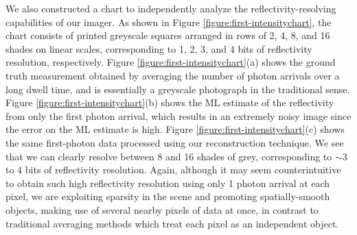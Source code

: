 We also constructed a chart to independently analyze the reflectivity-resolving capabilities of our imager. As shown in Figure \ref{figure:first-intensitychart}, the chart consists of printed greyscale squares arranged in rows of 2, 4, 8, and 16 shades on linear scales, corresponding to 1, 2, 3, and 4 bits of reflectivity resolution, respectively. Figure \ref{figure:first-intensitychart}(a) shows the ground truth measurement obtained by averaging the number of photon arrivals over a long dwell time, and is essentially a greyscale photograph in the traditional sense. Figure \ref{figure:first-intensitychart}(b) shows the ML estimate of the reflectivity from only the first photon arrival, which results in an extremely noisy image since the error on the ML estimate is high. Figure \ref{figure:first-intensitychart}(c) shows the same first-photon data processed using our reconstruction technique. We see that we can clearly resolve between 8 and 16 shades of grey, corresponding to $\sim$3 to 4 bits of reflectivity resolution. Again, although it may seem counterintuitive to obtain such high reflectivity resolution using only 1 photon arrival at each pixel, we are exploiting sparsity in the scene and promoting spatially-smooth objects, making use of several nearby pixels of data at once, in contrast to traditional averaging methods which treat each pixel as an independent object.

